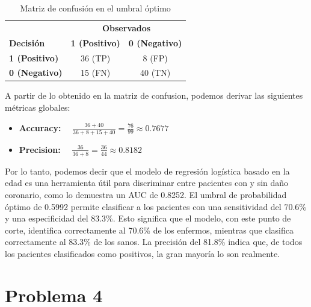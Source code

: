 \begin{table}[H]
    \centering
    \caption{Matriz de confusión en el umbral óptimo}
    \label{tab:confusion_matrix}
    \begin{tabular}{lcc}
        \toprule
        & \multicolumn{2}{c}{\textbf{Observados}} \\
        \cmidrule(lr){2-3}
        \textbf{Decisión} & \textbf{1 (Positivo)} & \textbf{0 (Negativo)} \\
        \midrule
        \textbf{1 (Positivo)} & 36 (TP) & 8 (FP) \\
        \textbf{0 (Negativo)} & 15 (FN) & 40 (TN) \\
        \bottomrule
    \end{tabular}
\end{table}

A partir de lo obtenido en la matriz de confusion, podemos derivar las siguientes métricas globales:

\begin{itemize}
    \item \textbf{Accuracy:} $\quad\displaystyle\frac{36 + 40}{36+8+15+40} = \frac{76}{99} \approx 0.7677 $
    \item \textbf{Precision:} $\quad\displaystyle\frac{36}{36+8} = \frac{36}{44} \approx 0.8182 $
\end{itemize}

\begin{tcolorbox}
Por lo tanto, podemos decir que el modelo de regresión logística basado en la edad es una herramienta útil para discriminar entre pacientes con y sin daño coronario, como lo demuestra un AUC de 0.8252. El umbral de probabilidad óptimo de 0.5992 permite clasificar a los pacientes con una sensitividad del 70.6\% y una especificidad del 83.3\%. Esto significa que el modelo, con este punto de corte, identifica correctamente al 70.6\% de los enfermos, mientras que clasifica correctamente al 83.3\% de los sanos. La precisión del 81.8\% indica que, de todos los pacientes clasificados como positivos, la gran mayoría lo son realmente.
\end{tcolorbox}

\newpage

\section*{Problema \textcolor{CIMATRed}{4}}

